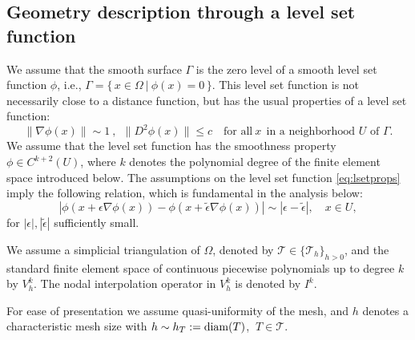 \documentclass[final]{siamltex}
\begin{document}
\subsection{Geometry description through a level set function} \label{prelim}
We assume that the smooth surface $\Gamma$ is the zero level of a smooth level set function $\phi$, i.e., $\Gamma= \{\, x \in \Omega~|~\phi(x)=0\,\}$.
This level set function is not necessarily close to a distance function, but has the usual properties of a level set function: 
\begin{equation} \label{eq:lsetprops}
\|\nabla \phi(x)\| \sim 1~,~~\|D^2 \phi(x)\| \leq c \quad \text{for all}~x~~ \text{in a neighborhood $U$ of $\Gamma$}.
\end{equation}
We assume that the level set function has the smoothness property $\phi \in C^{k+2}(U)$, where $k$ denotes the polynomial degree of the finite element space introduced below. The assumptions on the level set function \eqref{eq:lsetprops} imply the following relation, which is fundamental in the analysis below:
\begin{equation} \label{eq:lsetdist}
 |\phi(x+\epsilon \nabla \phi(x)) - \phi(x+\tilde \epsilon \nabla \phi(x))| \sim |\epsilon - \tilde \epsilon|, \quad x \in U,
\end{equation}
for $|\epsilon|, |\tilde \epsilon|$ sufficiently small.

We assume a simplicial triangulation of $\Omega$, denoted by ${\mathcal{T}} \in \{{\mathcal{T}}_h\}_{h>0}$, and the standard finite element space of continuous piecewise polynomials up to degree $k$ by $V_h^k$. 
The nodal interpolation operator in $V_h^k$ is denoted by ${I^k}$. 

For ease of presentation we assume quasi-uniformity of the mesh, and $h$ denotes a characteristic mesh size with $h\sim h_T:={\rm diam}(T)$, $~T\in{\mathcal{T}}$.
\end{document}
